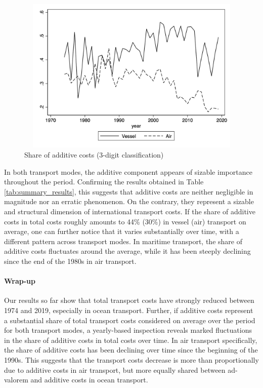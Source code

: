 \documentclass[a4paper,11pt]{article}
\begin{document}
\begin{figure}[htbp]
\caption{Share of additive costs (3-digit classification)}
\label{fig:part_cout_additif}
\begin{center}
 \includegraphics[width=12cm, height=7.5cm]{Figure1_share_of_additive_in_totalTC.jpg}
\end{center}
\end{figure}


In both transport modes, the additive component appears of sizable importance throughout the period.
Confirming the results obtained in Table \ref{tab:summary_results}, this suggests that additive costs are neither negligible in magnitude nor an erratic phenomenon.
On the contrary, they represent a sizable and structural dimension of international transport costs.
If the share of additive costs in total costs roughly amounts to 44\% (30\%) in vessel (air) transport on average, one can further notice that it varies substantially over time, with a different pattern across transport modes. In maritime transport, the share of additive costs fluctuates around the average, while it has been steeply declining since the end of the 1980s in air transport.

\paragraph{Wrap-up} Our results so far show that total transport costs have strongly reduced between 1974 and 2019, especially in ocean transport. Further, if additive costs represent a substantial share of total transport costs considered on average over the period for both transport modes, a yearly-based inspection reveals marked fluctuations in the share of additive costs in total costs over time. In air transport specifically, the share of additive costs has been declining over time since the beginning of the 1990s. This suggests that the transport costs decrease is more than proportionally due to additive costs in air transport, but more equally shared between ad-valorem and additive costs in ocean transport.
\end{document}
